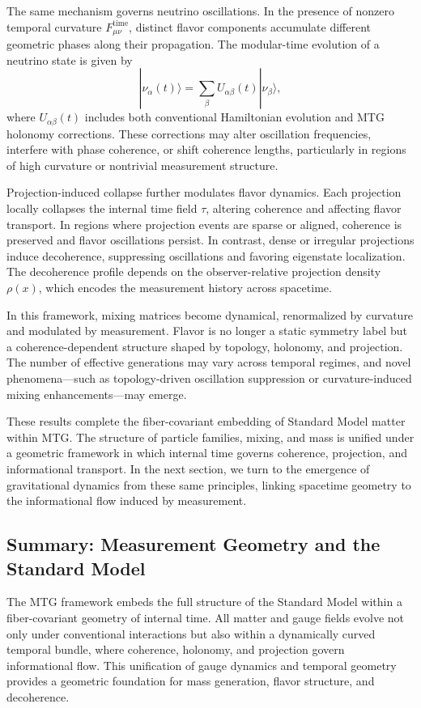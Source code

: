 \documentclass[11pt]{article}
\begin{document}
The same mechanism governs neutrino oscillations. In the presence of nonzero temporal curvature \( F^{\mathrm{time}}_{\mu\nu} \), distinct flavor components accumulate different geometric phases along their propagation. The modular-time evolution of a neutrino state is given by
\begin{equation}
|\nu_\alpha(t)\rangle = \sum_\beta U_{\alpha\beta}(t) |\nu_\beta\rangle,
\end{equation}
where \( U_{\alpha\beta}(t) \) includes both conventional Hamiltonian evolution and MTG holonomy corrections. These corrections may alter oscillation frequencies, interfere with phase coherence, or shift coherence lengths, particularly in regions of high curvature or nontrivial measurement structure.

Projection-induced collapse further modulates flavor dynamics. Each projection locally collapses the internal time field \( \tau \), altering coherence and affecting flavor transport. In regions where projection events are sparse or aligned, coherence is preserved and flavor oscillations persist. In contrast, dense or irregular projections induce decoherence, suppressing oscillations and favoring eigenstate localization. The decoherence profile depends on the observer-relative projection density \( \rho(x) \), which encodes the measurement history across spacetime.

In this framework, mixing matrices become dynamical, renormalized by curvature and modulated by measurement. Flavor is no longer a static symmetry label but a coherence-dependent structure shaped by topology, holonomy, and projection. The number of effective generations may vary across temporal regimes, and novel phenomena—such as topology-driven oscillation suppression or curvature-induced mixing enhancements—may emerge.

These results complete the fiber-covariant embedding of Standard Model matter within MTG. The structure of particle families, mixing, and mass is unified under a geometric framework in which internal time governs coherence, projection, and informational transport. In the next section, we turn to the emergence of gravitational dynamics from these same principles, linking spacetime geometry to the informational flow induced by measurement.
\subsection{Summary: Measurement Geometry and the Standard Model}
The MTG framework embeds the full structure of the Standard Model within a fiber-covariant geometry of internal time. All matter and gauge fields evolve not only under conventional interactions but also within a dynamically curved temporal bundle, where coherence, holonomy, and projection govern informational flow. This unification of gauge dynamics and temporal geometry provides a geometric foundation for mass generation, flavor structure, and decoherence.
\end{document}
